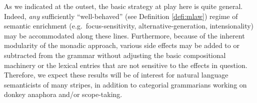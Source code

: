 	As we indicated at the outset, the basic strategy at play here is quite general. Indeed, \emph{any} sufficiently ``well-behaved'' (see Definition \ref{defi:mlaw}) regime of semantic enrichment (e.g.~focus-sensitivity, alternative-generation, intensionality) may be accommodated along these lines. Furthermore, because of the inherent modularity of the monadic approach, various side effects may be added to or subtracted from the grammar without adjusting the basic compositional machinery or the lexical entries that are not sensitive to the effects in question. Therefore, we expect these results will be of interest for natural language semanticists of many stripes, in addition to categorial grammarians working on donkey anaphora and/or scope-taking. %
	

{\small}


